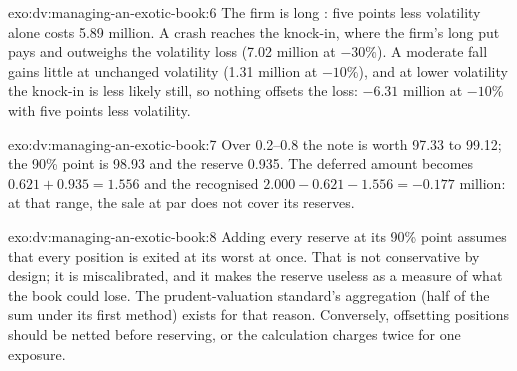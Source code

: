 \begin{solution}{exo:dv:managing-an-exotic-book:6}
The firm is long : five points less volatility alone costs 5.89 million. A crash reaches the knock-in, where the firm's long put pays and outweighs the volatility loss
(7.02 million at $-30\%$). A moderate fall gains little at unchanged volatility (1.31 million at $-10\%$), and at lower volatility the knock-in is less likely still, so
nothing offsets the  loss: $-6.31$ million at $-10\%$ with five points less volatility.
\end{solution}

\begin{solution}{exo:dv:managing-an-exotic-book:7}
Over 0.2--0.8 the note is worth 97.33 to 99.12; the 90\% point is 98.93 and the reserve 0.935. The deferred amount becomes $0.621+0.935=1.556$ and the recognised
 $2.000-0.621-1.556=-0.177$ million: at that range, the sale at par does not cover its reserves.
\end{solution}

\begin{solution}{exo:dv:managing-an-exotic-book:8}
Adding every reserve at its 90\% point assumes that every position is exited at its worst at once. That is not conservative by design; it is miscalibrated, and it makes
the reserve useless as a measure of what the book could lose. The prudent-valuation standard's aggregation (half of the sum under its first method) exists for that
reason. Conversely, offsetting positions should be netted before reserving, or the calculation charges twice for one exposure.
\end{solution}

